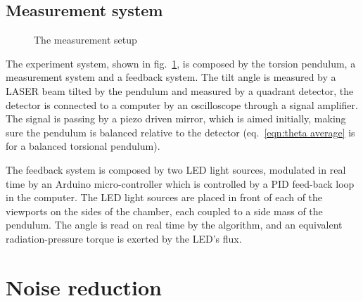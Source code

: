 \documentclass[\main/master.tex]{subfiles}
\begin{document}
\subsection{Measurement system}
\begin{figure}[htbp]
	\centering
	\caption[The measurement setup]{The measurement setup}
	\label{fig:setup}
\end{figure}
\FloatBarrier
\par\noindent
The experiment system, shown in fig.~\ref{fig:setup}, is composed by the torsion pendulum, a measurement system and a feedback system. The tilt angle is measured by a LASER beam tilted by the pendulum and measured by a quadrant detector, the detector is connected to a computer by an oscilloscope through a signal amplifier. The signal is passing by a piezo driven mirror, which is aimed initially, making sure the pendulum is balanced relative to the detector (eq.~\ref{eqn:theta average} is for a balanced torsional pendulum). 
\par\noindent
The feedback system is composed by two LED light sources, modulated in real time by an Arduino micro-controller which is controlled by a PID feed-back loop in the computer. The LED light sources are placed in front of each of the viewports on the sides of the chamber, each coupled to a side mass of the pendulum. The angle is read on real time by the algorithm, and an equivalent radiation-pressure torque is exerted by the LED's flux. 

\section{Noise reduction}
\end{document}
